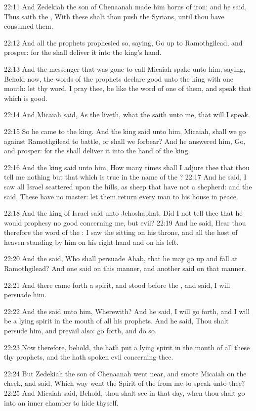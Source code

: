 22:11 And Zedekiah the son of Chenaanah made him horns of iron: and he said, Thus saith the \LORD, With these shalt thou push the Syrians, until thou have consumed them.

22:12 And all the prophets prophesied so, saying, Go up to Ramothgilead, and prosper: for the \LORD shall deliver it into the king's hand.

22:13 And the messenger that was gone to call Micaiah spake unto him, saying, Behold now, the words of the prophets declare good unto the king with one mouth: let thy word, I pray thee, be like the word of one of them, and speak that which is good.

22:14 And Micaiah said, As the \LORD liveth, what the \LORD saith unto me, that will I speak.

22:15 So he came to the king. And the king said unto him, Micaiah, shall we go against Ramothgilead to battle, or shall we forbear? And he answered him, Go, and prosper: for the \LORD shall deliver it into the hand of the king.

22:16 And the king said unto him, How many times shall I adjure thee that thou tell me nothing but that which is true in the name of the \LORD?  22:17 And he said, I saw all Israel scattered upon the hills, as sheep that have not a shepherd: and the \LORD said, These have no master: let them return every man to his house in peace.

22:18 And the king of Israel said unto Jehoshaphat, Did I not tell thee that he would prophesy no good concerning me, but evil?  22:19 And he said, Hear thou therefore the word of the \LORD: I saw the \LORD sitting on his throne, and all the host of heaven standing by him on his right hand and on his left.

22:20 And the \LORD said, Who shall persuade Ahab, that he may go up and fall at Ramothgilead? And one said on this manner, and another said on that manner.

22:21 And there came forth a spirit, and stood before the \LORD, and said, I will persuade him.

22:22 And the \LORD said unto him, Wherewith? And he said, I will go forth, and I will be a lying spirit in the mouth of all his prophets.  And he said, Thou shalt persude him, and prevail also: go forth, and do so.

22:23 Now therefore, behold, the \LORD hath put a lying spirit in the mouth of all these thy prophets, and the \LORD hath spoken evil concerning thee.

22:24 But Zedekiah the son of Chenaanah went near, and smote Micaiah on the cheek, and said, Which way went the Spirit of the \LORD from me to speak unto thee?  22:25 And Micaiah said, Behold, thou shalt see in that day, when thou shalt go into an inner chamber to hide thyself.

